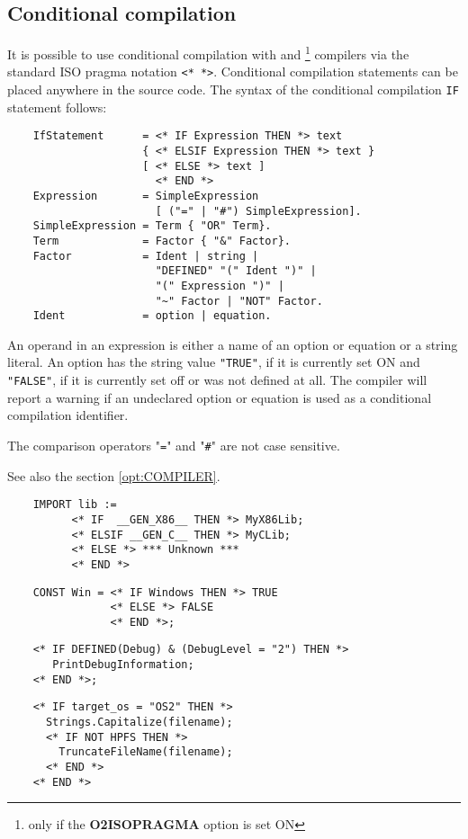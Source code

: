 \subsection{Conditional compilation}\label{m2:pragmas:cc}

It is possible to use conditional compilation with \mt{} and
\ot{}\footnote{only if the {\bf O2ISOPRAGMA} option is set ON}
compilers via the standard ISO pragma notation \verb|<* *>|.
Conditional compilation statements can be placed anywhere in the source
code. The syntax of the conditional compilation \verb'IF' statement
follows:
\begin{verbatim}
    IfStatement      = <* IF Expression THEN *> text
                     { <* ELSIF Expression THEN *> text }
                     [ <* ELSE *> text ]
                       <* END *>
    Expression       = SimpleExpression
                       [ ("=" | "#") SimpleExpression].
    SimpleExpression = Term { "OR" Term}.
    Term             = Factor { "&" Factor}.
    Factor           = Ident | string |
                       "DEFINED" "(" Ident ")" |
                       "(" Expression ")" |
                       "~" Factor | "NOT" Factor.
    Ident            = option | equation.
\end{verbatim}

An operand in an expression is either a name of an option or equation or
a string literal. An option has the string value \verb'"TRUE"', if it is
currently set ON and \verb'"FALSE"', if it is currently set off
or was not defined at all. The compiler will report a warning if an
undeclared option or equation is used as a conditional compilation identifier.

The comparison operators "\verb'='" and "\verb'#'" are not case sensitive.

See also the section \ref{opt:COMPILER}.

\Examples
\begin{verbatim}
    IMPORT lib :=
          <* IF  __GEN_X86__ THEN *> MyX86Lib;
          <* ELSIF __GEN_C__ THEN *> MyCLib;
          <* ELSE *> *** Unknown ***
          <* END *>
\end{verbatim}

\begin{verbatim}
    CONST Win = <* IF Windows THEN *> TRUE
                <* ELSE *> FALSE
                <* END *>;
\end{verbatim}

\begin{verbatim}
    <* IF DEFINED(Debug) & (DebugLevel = "2") THEN *>
       PrintDebugInformation;
    <* END *>;
\end{verbatim}

\begin{verbatim}
    <* IF target_os = "OS2" THEN *>
      Strings.Capitalize(filename);
      <* IF NOT HPFS THEN *>
        TruncateFileName(filename);
      <* END *>
    <* END *>
\end{verbatim}


